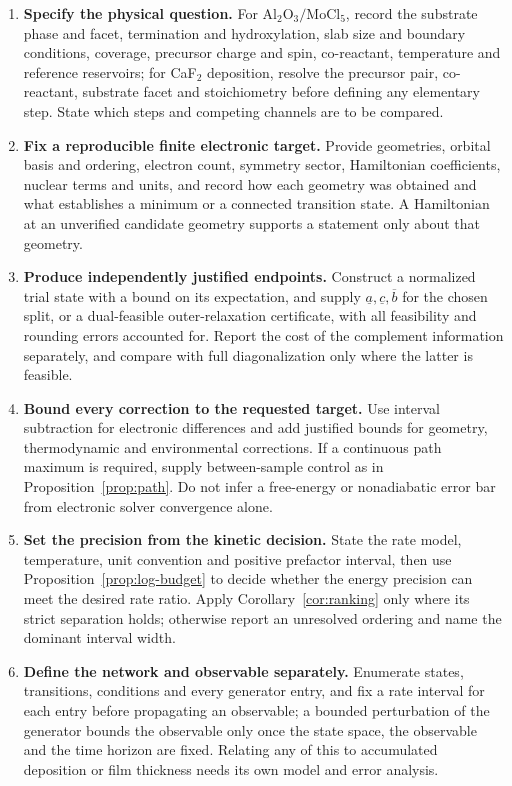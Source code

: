 \documentclass[11pt,a4paper]{article}
\theoremstyle{plain}
\theoremstyle{definition}
\theoremstyle{remark}
\begin{document}
\begin{enumerate}
\item \textbf{Specify the physical question.} For
$\mathrm{Al_2O_3}/\mathrm{MoCl_5}$, record the substrate phase and facet,
termination and hydroxylation, slab size and boundary conditions, coverage,
precursor charge and spin, co-reactant, temperature and reference reservoirs;
for CaF$_2$ deposition, resolve the precursor pair, co-reactant, substrate facet
and stoichiometry before defining any elementary step. State which steps and
competing channels are to be compared.

\item \textbf{Fix a reproducible finite electronic target.} Provide geometries,
orbital basis and ordering, electron count, symmetry sector, Hamiltonian
coefficients, nuclear terms and units, and record how each geometry was obtained
and what establishes a minimum or a connected transition state. A Hamiltonian at
an unverified candidate geometry supports a statement only about that geometry.

\item \textbf{Produce independently justified endpoints.} Construct a normalized
trial state with a bound on its expectation, and supply
$\underline a,\underline c,\overline b$ for the chosen split, or a dual-feasible
outer-relaxation certificate, with all feasibility and rounding errors accounted
for. Report the cost of the complement information separately, and compare with
full diagonalization only where the latter is feasible.

\item \textbf{Bound every correction to the requested target.} Use interval
subtraction for electronic differences and add justified bounds for geometry,
thermodynamic and environmental corrections. If a continuous path maximum is
required, supply between-sample control as in Proposition~\ref{prop:path}. Do
not infer a free-energy or nonadiabatic error bar from electronic solver
convergence alone.

\item \textbf{Set the precision from the kinetic decision.} State the rate model,
temperature, unit convention and positive prefactor interval, then use
Proposition~\ref{prop:log-budget} to decide whether the energy precision can meet
the desired rate ratio. Apply Corollary~\ref{cor:ranking} only where its strict
separation holds; otherwise report an unresolved ordering and name the dominant
interval width.

\item \textbf{Define the network and observable separately.} Enumerate states,
transitions, conditions and every generator entry, and fix a rate interval for
each entry before propagating an observable; a bounded perturbation of the
generator bounds the observable only once the state space, the observable and
the time horizon are fixed. Relating any of this to accumulated deposition or
film thickness needs its own model and error analysis.
\end{enumerate}
\end{document}
